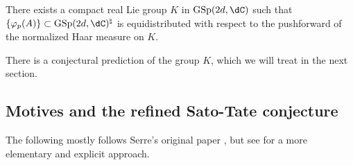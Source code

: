 \begin{conjecture}[Serre]
There exists a compact real Lie group $K$ in $\operatorname{GSp}(2d,\dC)$ such 
that $\{\varphi_p(A)\}\subset \operatorname{GSp}(2 d,\dC)^\natural$ is 
equidistributed with respect to the pushforward of the normalized Haar 
measure on $K$. 
\end{conjecture}

There is a conjectural prediction of the group $K$, which we will treat in the 
next section. 





\subsection{Motives and the refined Sato-Tate conjecture}

The following mostly follows Serre's original paper \cite{se94}, but see 
\cite{se12} for a more elementary and explicit approach. 

